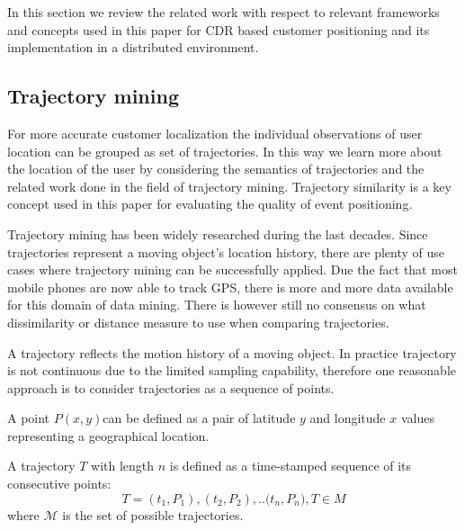 In this section we review the related work with respect to relevant frameworks and concepts used in this paper for CDR based customer positioning and its implementation in a distributed environment.

\subsection{Trajectory mining}
For more accurate customer localization the individual observations of user location can be grouped as set of trajectories. In this way we learn more about the location of the user by considering the semantics of trajectories and the related work done in the field of trajectory mining. Trajectory similarity is a key concept used in this paper for evaluating the quality of event positioning.

Trajectory mining has been widely researched during the last decades. Since trajectories represent a moving object's location history, there are plenty of use cases where trajectory mining can be successfully applied.  Due the fact that most mobile phones are now able to track GPS, there is more and more data available for this domain of data mining. There is however still no consensus on what dissimilarity or distance measure to use when comparing trajectories.

A trajectory reflects the motion history of a moving object. In practice trajectory is not continuous due to the limited sampling capability, therefore one reasonable approach is to consider trajectories as a sequence of points.

\begin{definition}
A point $P(x,y)$can be defined as a pair of latitude $y$ and longitude $x$ values representing a geographical location.
\end{definition}

\begin{definition}
A trajectory $T$ with length $n$ is defined as a time-stamped sequence of its consecutive points: \[T={(t_{1},P_{1}), (t_{2},P_{2}), .. (t_{n},P_{n}}), T \in M\]
where $\mathcal{M}$ is the set of possible trajectories.
\end{definition}

